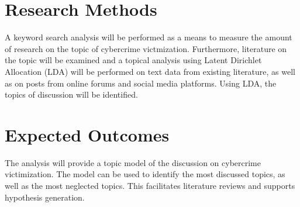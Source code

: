 \documentclass[12pt]{article}
\begin{document}
\section{Research Methods}

A keyword search analysis will be performed as a means to measure the amount of 
research on the topic of cybercrime victmization. Furthermore, literature on the topic
will be examined and a topical analysis using Latent Dirichlet Allocation (LDA) will be 
performed on text data from existing literature, as well as on posts from online forums
and social media platforms. Using LDA, the topics of discussion will be identified.

\section{Expected Outcomes}

The analysis will provide a topic model of the discussion on cybercrime victimization.
The model can be used to identify the most discussed topics, as well as the most
neglected topics. This facilitates literature reviews and supports hypothesis generation.



\end{document}
